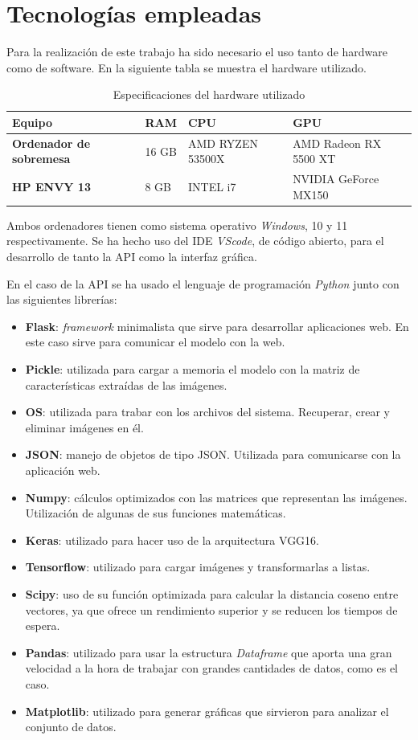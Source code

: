 \documentclass[12pt]{report} %
\begin{document}
	\section{Tecnologías empleadas}
	Para la realización de este trabajo ha sido necesario el uso tanto de hardware como de software.
	En la siguiente tabla se muestra el hardware utilizado.
	\begin{table}[H]
		\centering
		\caption{Especificaciones del hardware utilizado}
		\begin{tabular}{llll}
				\toprule
				\textbf{Equipo} & \textbf{RAM} & \textbf{CPU} & \textbf{GPU}\\
				\midrule
				\textbf{Ordenador de sobremesa} & 16 GB & AMD RYZEN 53500X & AMD Radeon RX 5500 XT  \\
				\textbf{HP ENVY 13} & 8 GB & INTEL i7 & NVIDIA GeForce MX150 \\
				\bottomrule
		\end{tabular}
	\end{table}

	Ambos ordenadores tienen como sistema operativo \textit{Windows}, 10 y 11 respectivamente.
	Se ha hecho uso del IDE \textit{VScode}, de código abierto, para el desarrollo de tanto la API como la interfaz gráfica.
	
	
	En el caso de la API se ha usado el lenguaje de programación \textit{Python} junto con las siguientes librerías:
	
	\begin{itemize}
		\item \textbf{Flask}: \textit{framework} minimalista que sirve para desarrollar aplicaciones web. En este caso
		sirve para comunicar el modelo con la web. 
		\item \textbf{Pickle}: utilizada para cargar a memoria el modelo con la matriz de características extraídas de las imágenes.
		\item \textbf{OS}: utilizada para trabar con los archivos del sistema. Recuperar, crear y eliminar imágenes en él.
		\item \textbf{JSON}: manejo de objetos de tipo JSON. Utilizada para comunicarse con la aplicación web.
		\item \textbf{Numpy}: cálculos optimizados con las matrices que representan las imágenes. Utilización de algunas de sus
		funciones matemáticas. 
		\item \textbf{Keras}: utilizado para hacer uso de la arquitectura VGG16.  
		\item \textbf{Tensorflow}: utilizado para cargar imágenes y transformarlas a listas.
		\item \textbf{Scipy}: uso de su función optimizada para calcular la distancia coseno entre vectores, ya que ofrece un rendimiento
		superior y se reducen los tiempos de espera.
		\item \textbf{Pandas}: utilizado para usar la estructura \textit{Dataframe} que aporta una gran velocidad a la hora de trabajar
		con grandes cantidades de datos, como es el caso.
		\item \textbf{Matplotlib}: utilizado para generar gráficas que sirvieron para analizar el conjunto de datos.
	\end{itemize}
\end{document}

